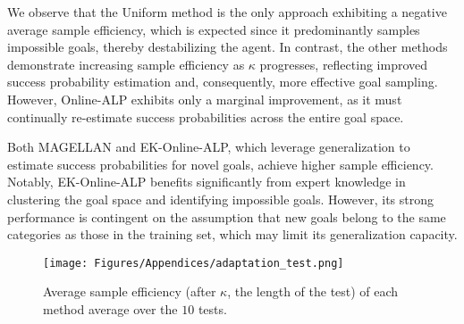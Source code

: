 We observe that the Uniform method is the only approach exhibiting a negative average sample efficiency, which is expected since it predominantly samples impossible goals, thereby destabilizing the agent. In contrast, the other methods demonstrate increasing sample efficiency as $\kappa$ progresses, reflecting improved success probability estimation and, consequently, more effective goal sampling. However, Online-ALP exhibits only a marginal improvement, as it must continually re-estimate success probabilities across the entire goal space.

Both MAGELLAN and EK-Online-ALP, which leverage generalization to estimate success probabilities for novel goals, achieve higher sample efficiency. Notably, EK-Online-ALP benefits significantly from expert knowledge in clustering the goal space and identifying impossible goals. However, its strong performance is contingent on the assumption that new goals belong to the same categories as those in the training set, which may limit its generalization capacity.

\begin{figure}
    \centering
    \texttt{[image: Figures/Appendices/adaptation\_test.png]}
    \caption{Average sample efficiency (after $\kappa$, the length of the test) of each method average over the $10$ tests.}
    \label{fig:app_adaptation_tests_sample_efficiency}
\end{figure}

